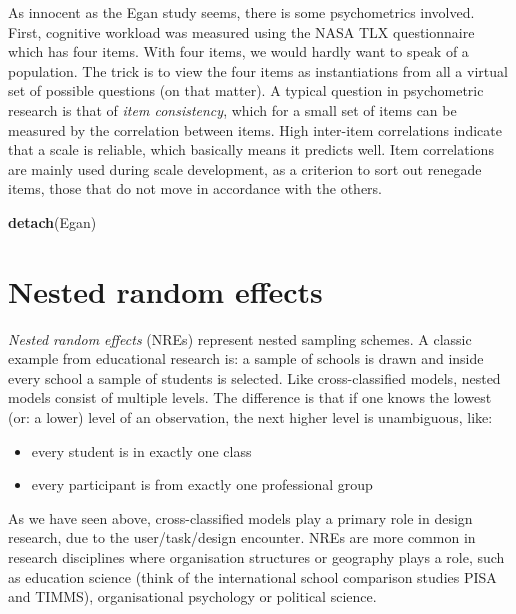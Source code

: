 \documentclass[]{svmono}
\newenvironment{Shaded}{\begin{snugshade}}{\end{snugshade}}
\newcommand{\KeywordTok}[1]{\textcolor[rgb]{0.13,0.29,0.53}{\textbf{#1}}}
\newcommand{\NormalTok}[1]{#1}
\providecommand{\tightlist}{%
  \setlength{\itemsep}{0pt}\setlength{\parskip}{0pt}}
\begin{document}
As innocent as the Egan study seems, there is some psychometrics
involved. First, cognitive workload was measured using the NASA TLX
questionnaire which has four items. With four items, we would hardly
want to speak of a population. The trick is to view the four items as
instantiations from all a virtual set of possible questions (on that
matter). A typical question in psychometric research is that of
\emph{item consistency}, which for a small set of items can be measured
by the correlation between items. High inter-item correlations indicate
that a scale is reliable, which basically means it predicts well. Item
correlations are mainly used during scale development, as a criterion to
sort out renegade items, those that do not move in accordance with the
others.

\begin{Shaded}
\begin{Highlighting}[]
\KeywordTok{detach}\NormalTok{(Egan)}
\end{Highlighting}
\end{Shaded}

\section{Nested random effects}\label{nested-random-effects}

\emph{Nested random effects} (NREs) represent nested sampling schemes. A
classic example from educational research is: a sample of schools is
drawn and inside every school a sample of students is selected. Like
cross-classified models, nested models consist of multiple levels. The
difference is that if one knows the lowest (or: a lower) level of an
observation, the next higher level is unambiguous, like:

\begin{itemize}
\tightlist
\item
  every student is in exactly one class
\item
  every participant is from exactly one professional group
\end{itemize}

As we have seen above, cross-classified models play a primary role in
design research, due to the user/task/design encounter. NREs are more
common in research disciplines where organisation structures or
geography plays a role, such as education science (think of the
international school comparison studies PISA and TIMMS), organisational
psychology or political science.
\end{document}
